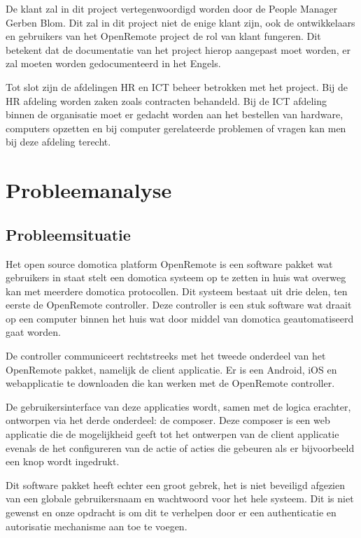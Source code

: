 \documentclass[]{article}
\begin{document}
De klant zal in dit project vertegenwoordigd worden door de People Manager
Gerben Blom. Dit zal in dit project niet de enige klant zijn, ook de
ontwikkelaars en gebruikers van het OpenRemote project de rol van klant
fungeren. Dit betekent dat de documentatie van het project hierop aangepast
moet worden, er zal moeten worden gedocumenteerd in het Engels.

Tot slot zijn de afdelingen HR en ICT beheer betrokken met het project. Bij
de HR afdeling worden zaken zoals contracten behandeld. Bij de ICT afdeling
binnen de organisatie moet er gedacht worden aan het bestellen van
hardware, computers opzetten en bij computer gerelateerde problemen of
vragen kan men bij deze afdeling terecht.

\newpage
\section{Probleemanalyse}

\subsection{Probleemsituatie}

Het open source domotica platform OpenRemote is een software pakket wat
gebruikers in staat stelt een domotica systeem op te zetten in huis wat
overweg kan met meerdere domotica protocollen. Dit systeem bestaat uit drie
delen, ten eerste de OpenRemote controller. Deze controller is een stuk
software wat draait op een computer binnen het huis wat door middel van
domotica geautomatiseerd gaat worden.

De controller communiceert rechtstreeks met het tweede onderdeel van het
OpenRemote pakket, namelijk de client applicatie. Er is een Android, iOS en
webapplicatie te downloaden die kan werken met de OpenRemote controller.

De gebruikersinterface van deze applicaties wordt, samen met de logica
erachter, ontworpen via het derde onderdeel: de composer. Deze composer is
een web applicatie die de mogelijkheid geeft tot het ontwerpen van de
client applicatie evenals de het configureren van de actie of acties die
gebeuren als er bijvoorbeeld een knop wordt ingedrukt.

Dit software pakket heeft echter een groot gebrek, het is niet beveiligd
afgezien van een globale gebruikersnaam en wachtwoord voor het hele
systeem. Dit is niet gewenst en onze opdracht is om dit te verhelpen door
er een authenticatie en autorisatie mechanisme aan toe te voegen.
\end{document}
